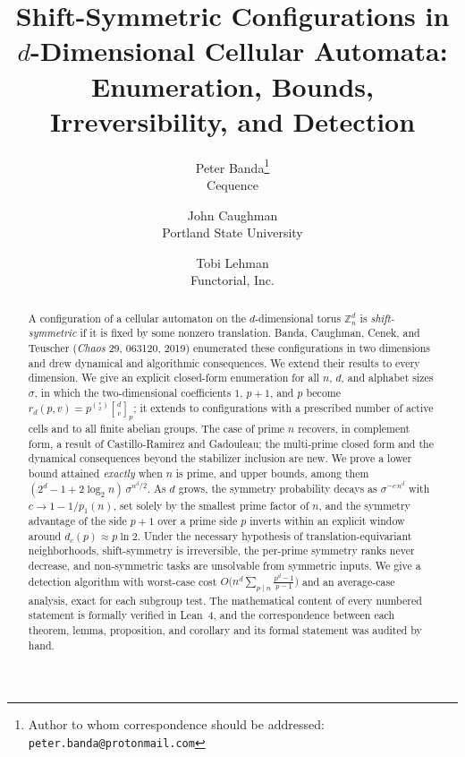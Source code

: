 \documentclass[11pt,a4paper]{article}
\title{Shift-Symmetric Configurations in $d$-Dimensional Cellular Automata:\\
Enumeration, Bounds, Irreversibility, and Detection}
\author{Peter Banda\thanks{Author to whom correspondence should be addressed: \texttt{peter.banda@protonmail.com}}\\{\normalsize Cequence} \and John Caughman\\{\normalsize Portland State University} \and Tobi Lehman\\{\normalsize Functorial, Inc.}}
\date{}
\theoremstyle{remark}
\newcommand{\ZZ}{\mathbb{Z}}
\newcommand{\gaussbinom}[2]{\genfrac{[}{]}{0pt}{}{#1}{#2}}
\begin{document}
\maketitle

\begin{abstract}
A configuration of a cellular automaton on the $d$-dimensional torus
$\ZZ_n^d$ is \emph{shift-symmetric} if it is fixed by some nonzero
translation. Banda, Caughman, Cenek, and Teuscher (\emph{Chaos} 29, 063120,
2019) enumerated these configurations in two dimensions and drew dynamical
and algorithmic consequences. We extend their results to every dimension.
We give an explicit closed-form enumeration for all $n$, $d$, and alphabet
sizes $\sigma$, in which the two-dimensional coefficients $1$, $p{+}1$, and
$p$ become $r_d(p,v)=p^{\binom v2}\gaussbinom dv_p$; it extends to
configurations with a prescribed number of active cells and to all finite
abelian groups. The case of prime
$n$ recovers, in complement form, a result of Castillo-Ramirez and
Gadouleau; the multi-prime closed form and the dynamical consequences
beyond the stabilizer inclusion are new. We prove a lower bound attained
\emph{exactly} when $n$ is prime, and upper bounds, among them
$(2^d-1+2\log_2 n)\,\sigma^{n^d/2}$. As $d$ grows, the symmetry probability
decays as $\sigma^{-c\,n^d}$ with $c\to1-1/p_1(n)$, set solely by the
smallest prime factor of $n$, and the symmetry advantage of the side
$p{+}1$ over a prime side $p$ inverts within an explicit window around
$d_c(p)\approx p\ln2$. Under the necessary hypothesis of
translation-equivariant neighborhoods, shift-symmetry is irreversible, the
per-prime symmetry ranks never decrease, and non-symmetric tasks are
unsolvable from symmetric inputs. We give a detection algorithm with
worst-case cost $O\bigl(n^d\sum_{p\mid n}\frac{p^d-1}{p-1}\bigr)$ and an
average-case analysis, exact for each subgroup test. The mathematical
content of every numbered statement is formally verified in Lean~4, and the
correspondence between each theorem, lemma, proposition, and corollary and
its formal statement was audited by hand.
\end{abstract}
%
%
\end{document}
